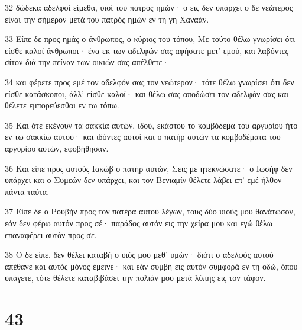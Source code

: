 \par 32 δώδεκα αδελφοί είμεθα, υιοί του πατρός ημών· ο εις δεν υπάρχει ο δε νεώτερος είναι την σήμερον μετά του πατρός ημών εν τη γη Χαναάν.
\par 33 Είπε δε προς ημάς ο άνθρωπος, ο κύριος του τόπου, Με τούτο θέλω γνωρίσει ότι είσθε καλοί άνθρωποι· ένα εκ των αδελφών σας αφήσατε μετ' εμού, και λαβόντες σίτον διά την πείναν των οικιών σας απέλθετε·
\par 34 και φέρετε προς εμέ τον αδελφόν σας τον νεώτερον· τότε θέλω γνωρίσει ότι δεν είσθε κατάσκοποι, άλλ' είσθε καλοί· και θέλω σας αποδώσει τον αδελφόν σας και θέλετε εμπορεύεσθαι εν τω τόπω.
\par 35 Και ότε εκένουν τα σακκία αυτών, ιδού, εκάστου το κομβόδεμα του αργυρίου ήτο εν τω σακκίω αυτού· και ιδόντες αυτοί και ο πατήρ αυτών τα κομβοδέματα του αργυρίου αυτών, εφοβήθησαν.
\par 36 Και είπε προς αυτούς Ιακώβ ο πατήρ αυτών, Σεις με ητεκνώσατε· ο Ιωσήφ δεν υπάρχει και ο Συμεών δεν υπάρχει, και τον Βενιαμίν θέλετε λάβει επ' εμέ ήλθον πάντα ταύτα.
\par 37 Είπε δε ο Ρουβήν προς τον πατέρα αυτού λέγων, τους δύο υιούς μου θανάτωσον, εάν δεν φέρω αυτόν προς σέ· παράδος αυτόν εις την χείρα μου και εγώ θέλω επαναφέρει αυτόν προς σε.
\par 38 Ο δε είπε, δεν θέλει καταβή ο υιός μου μεθ' υμών· διότι ο αδελφός αυτού απέθανε και αυτός μόνος έμεινε· και εάν συμβή εις αυτόν συμφορά εν τη οδώ, όπου υπάγετε, τότε θέλετε καταβιβάσει την πολιάν μου μετά λύπης εις τον τάφον.

\chapter{43}

